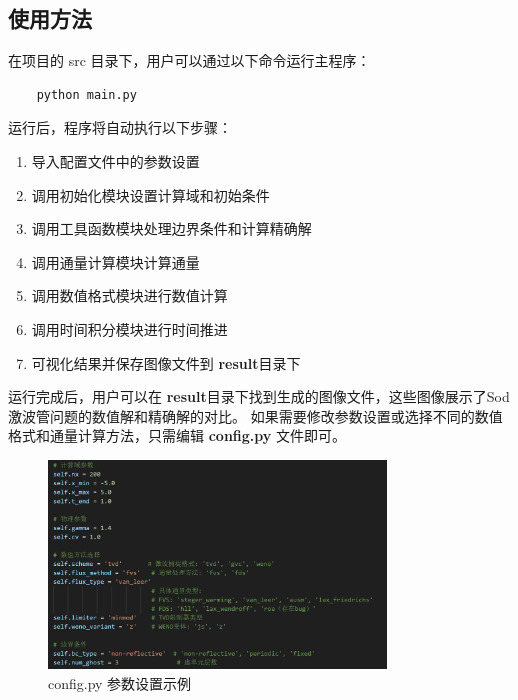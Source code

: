 \documentclass[UTF8]{ctexart}
\begin{document}
\subsection{使用方法}
在项目的 src 目录下，用户可以通过以下命令运行主程序：
\begin{verbatim}
    python main.py
\end{verbatim}
运行后，程序将自动执行以下步骤：
\begin{enumerate}           
    \item 导入配置文件中的参数设置
    \item 调用初始化模块设置计算域和初始条件
    \item 调用工具函数模块处理边界条件和计算精确解
    \item 调用通量计算模块计算通量
    \item 调用数值格式模块进行数值计算
    \item 调用时间积分模块进行时间推进
    \item 可视化结果并保存图像文件到 \textbf{result}目录下
\end{enumerate}
运行完成后，用户可以在 \textbf{result}目录下找到生成的图像文件，这些图像展示了Sod激波管问题的数值解和精确解的对比。
如果需要修改参数设置或选择不同的数值格式和通量计算方法，只需编辑 \textbf{config.py} 文件即可。
\begin{figure}
    \centering
    \includegraphics[width=0.8\textwidth]{config_example.png}
    \caption{config.py 参数设置示例}
    \label{fig:config_example}
\end{figure}
\end{document}
